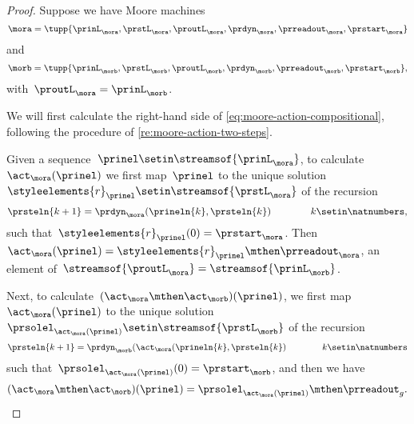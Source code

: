 \begin{proof}
    Suppose we have Moore machines
    \begin{equation}
        \mora = \tupp{\prinL_{\mora},\prstL_{\mora},\proutL_{\mora},\prdyn_{\mora},\prreadout_{\mora},\prstart_{\mora}}
    \end{equation}
    and
    \begin{equation}
        \morb = \tupp{\prinL_{\morb},\prstL_{\morb},\proutL_{\morb},\prdyn_{\morb},\prreadout_{\morb},\prstart_{\morb}},
    \end{equation}
    with~$\proutL_\mora = \prinL_\morb$.

    We will first calculate the right-hand side of \cref{eq:moore-action-compositional}, following the procedure of \cref{re:moore-action-two-steps}.

    Given a sequence~$\prinel \setin \streamsof{\prinL_{\mora}}$, to calculate~$\act_\mora(\prinel)$ we first map~$\prinel$ to the unique solution~$\styleelements{r}_\prinel \setin \streamsof{\prstL_{\mora}}$ of the recursion
    \begin{equation}
        \prsteln{k+1} = \prdyn_\mora(\prineln{k}, \prsteln{k})  \qquad \qquad k \setin \natnumbers,
    \end{equation}
    such that~$\styleelements{r}_\prinel(0) = \prstart_{\mora}$.
    Then~$\act_\mora(\prinel) = \styleelements{r}_\prinel \mthen \prreadout_\mora$, an element of~$\streamsof{\proutL_{\mora}} = \streamsof{\prinL_{\morb}}$.

    Next, to calculate~$(\act_\mora \mthen \act_\morb)(\prinel)$, we first map~$\act_\mora(\prinel)$ to the unique solution~$\prsolel_{\act_\mora(\prinel)} \setin \streamsof{\prstL_{\morb}}$ of the recursion
        \begin{equation}
            \prsteln{k+1} = \prdyn_\morb(\act_\mora(\prineln{k}, \prsteln{k})  \qquad \qquad k \setin \natnumbers
        \end{equation}
        such that~$\prsolel_{\act_\mora(\prinel)}(0) = \prstart_{\morb}$, and then we have
        \begin{equation}
            \label{eq:Moore-act-composition-1}
            (\act_\mora \mthen \act_\morb)(\prinel) = \prsolel_{\act_\mora(\prinel)} \mthen \prreadout_g.
        \end{equation}


\end{proof}
